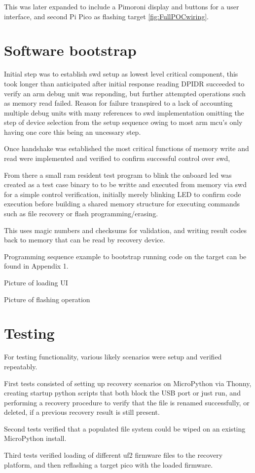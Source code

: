 This was later expanded to include a Pimoroni display and buttons for a user interface, and second Pi Pico as flashing target \autoref{fig:FullPOCwiring}.

\section{Software bootstrap}
Initial step was to establish \gls{swd} setup as lowest level critical component, this took longer than anticipated after initial response reading DPIDR succeeded to verify an \gls{arm} debug unit was reponding, but further attempted operations such as memory read failed. Reason for failure transpired to a lack of accounting multiple debug units\cite{raspberrypiltdRaspberryPiPico} with many references to \gls{swd} implementation omitting the step of device selection from the setup sequence owing to most \gls{arm} \gls{mcu}'s only having one core this being an uncessary step.

Once handshake was established the most critical functions of memory write and read were implemented and verified to confirm successful control over \gls{swd}, 

From there a small \gls{ram} resident test program to blink the onboard \gls{led} was created as a test case binary to to be writte and executed from memory via \gls{swd} for a simple control verification, initially merely blinking LED to confirm code execution before building a shared memory structure for executing commands such as file recovery or flash programming/erasing.

This uses magic numbers and checksums for validation, and writing result codes back to memory that can be read by recovery device.

Programming sequence example to bootstrap running code on the target can be found in Appendix 1.


Picture of loading UI

Picture of flashing operation


\section{Testing}

For testing functionality, various likely scenarios were setup and verified repeatably.

First tests consisted of setting up recovery scenarios on MicroPython via Thonny, creating startup python scripts that both block the USB port or just run, and performing a recovery procedure to verify that the file is renamed successfully, or deleted, if a previous recovery result is still present.

Second tests verified that a populated file system could be wiped on an existing MicroPython install.

Third tests verified loading of different uf2 firmware files to the recovery platform, and then reflashing a target pico with the loaded firmware.



